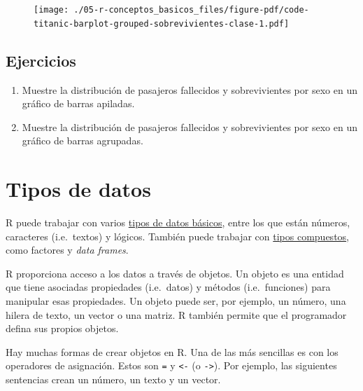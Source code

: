 \documentclass[
  letterpaper,
  DIV=11,
  numbers=noendperiod]{scrreprt}
\providecommand{\tightlist}{%
  \setlength{\itemsep}{0pt}\setlength{\parskip}{0pt}}\usepackage{longtable,booktabs,array}
\begin{document}
\begin{figure}[H]

{\centering \texttt{[image: ./05-r-conceptos\_basicos\_files/figure-pdf/code-titanic-barplot-grouped-sobrevivientes-clase-1.pdf]}

}

\end{figure}

\hypertarget{ejercicios-3}{%
\subsection{Ejercicios}\label{ejercicios-3}}

\begin{enumerate}
\def\labelenumi{\arabic{enumi}.}
\tightlist
\item
  Muestre la distribución de pasajeros fallecidos y sobrevivientes por
  sexo en un gráfico de barras apiladas.
\item
  Muestre la distribución de pasajeros fallecidos y sobrevivientes por
  sexo en un gráfico de barras agrupadas.
\end{enumerate}

\hypertarget{tipos-de-datos}{%
\section{Tipos de datos}\label{tipos-de-datos}}

R puede trabajar con varios
\href{https://cran.r-project.org/doc/manuals/r-release/R-lang.html\#Basic-types}{tipos
de datos básicos}, entre los que están números, caracteres (i.e.~textos)
y lógicos. También puede trabajar con
\href{https://cran.r-project.org/doc/manuals/r-release/R-lang.html\#Special-compound-objects}{tipos
compuestos}, como factores y \emph{data frames}.

R proporciona acceso a los datos a través de objetos. Un objeto es una
entidad que tiene asociadas propiedades (i.e.~datos) y métodos
(i.e.~funciones) para manipular esas propiedades. Un objeto puede ser,
por ejemplo, un número, una hilera de texto, un vector o una matriz. R
también permite que el programador defina sus propios objetos.

Hay muchas formas de crear objetos en R. Una de las más sencillas es con
los operadores de asignación. Estos son \texttt{=} y
\texttt{\textless{}-} (o \texttt{-\textgreater{}}). Por ejemplo, las
siguientes sentencias crean un número, un texto y un vector.
\end{document}
